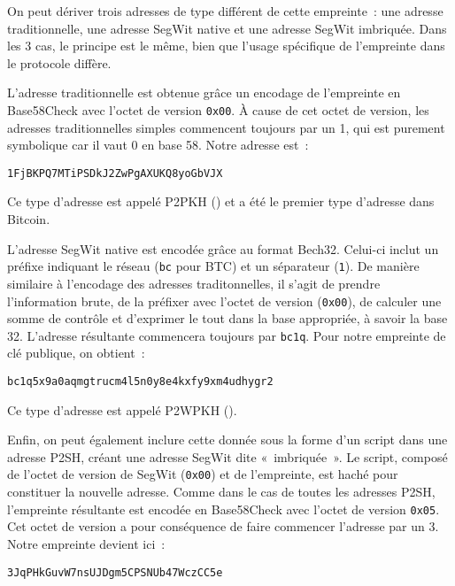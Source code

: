 On peut dériver trois adresses de type différent de cette empreinte~: une adresse traditionnelle, une adresse SegWit native et une adresse SegWit imbriquée. Dans les 3 cas, le principe est le même, bien que l'usage spécifique de l'empreinte dans le protocole diffère.

L'adresse traditionnelle est obtenue grâce un encodage de l'empreinte en Base58Check avec l'octet de version \verb?0x00?. À cause de cet octet de version, les adresses traditionnelles simples commencent toujours par un 1, qui est purement symbolique car il vaut 0 en base 58. Notre adresse est~:

\begin{Verbatim}[fontsize=\footnotesize]
1FjBKPQ7MTiPSDkJ2ZwPgAXUKQ8yoGbVJX
\end{Verbatim}

Ce type d'adresse est appelé P2PKH () et a été le premier type d'adresse dans Bitcoin.

L'adresse SegWit native est encodée grâce au format Bech32. Celui-ci inclut un préfixe indiquant le réseau (\verb?bc? pour BTC) et un séparateur (\verb?1?). De manière similaire à l'encodage des adresses traditonnelles, il s'agit de prendre l'information brute, de la préfixer avec l'octet de version (\verb?0x00?), de calculer une somme de contrôle et d'exprimer le tout dans la base appropriée, à savoir la base 32. L'adresse résultante commencera toujours par \verb?bc1q?. Pour notre empreinte de clé publique, on obtient~: 

\begin{Verbatim}[fontsize=\footnotesize]
bc1q5x9a0aqmgtrucm4l5n0y8e4kxfy9xm4udhygr2
\end{Verbatim}

Ce type d'adresse est appelé P2WPKH ().

Enfin, on peut également inclure cette donnée sous la forme d'un script dans une adresse P2SH, créant une adresse SegWit dite «~imbriquée~». Le script, composé de l'octet de version de SegWit (\verb?0x00?) et de l'empreinte, est haché pour constituer la nouvelle adresse. Comme dans le cas de toutes les adresses P2SH, l'empreinte résultante est encodée en Base58Check avec l'octet de version \verb?0x05?. Cet octet de version a pour conséquence de faire commencer l'adresse par un 3. Notre empreinte devient ici~:

\begin{Verbatim}[fontsize=\footnotesize]
3JqPHkGuvW7nsUJDgm5CPSNUb47WczCC5e
\end{Verbatim}

